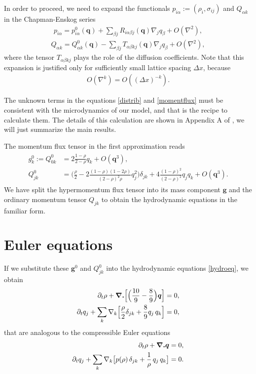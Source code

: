 In order to proceed, we need to expand the functionals $ p_{i\alpha} := (\rho_i,\sigma_{ij})$ and $Q_{\alpha k}$ in the Chapman-Enskog series
\begin{align} \label{distrib}
p_{i \alpha} = p_{i \alpha}^0(\bm{q}) + \sum_{\beta j} R_{i \alpha \beta j}(\bm{q}) \nabla_{j} q_{\beta} + O(\nabla^2),
\end{align}
\begin{align} \label{momentflux}
Q_{\alpha k} = Q_{\alpha k}^0(\bm{q}) - \sum_{\beta j} T_{\alpha \beta k j}(\bm{q}) \nabla_{j} q_{\beta} + O(\nabla^2),
\end{align}
where the tensor $T_{\alpha \beta k j}$ plays the role of the diffusion coefficients.
Note that this expansion is justified only for sufficiently small lattice spacing $\Delta x$, because
\begin{align*}
O(\nabla^k) = O((\Delta x)^{-k}).
\end{align*}

The unknown terms in the equations \ref{distrib} and \ref{momentflux} must be consistent with the microdynamics of our model, and that is the recipe to calculate them.
The details of this calculation are shown in Appendix A of \cite{nasilowski}, we will just summarize the main results.

The momentum flux tensor in the first approximation reads
\begin{align} \label{mft1ap}
\begin{split}
g^0_k := Q^0_{0k} &= 2 \frac{1 - \rho}{2 - \rho} q_k + O(\bm{q}^3), \\
Q^0_{jk} &= \Big( \frac{\rho}{2} - 2 \frac{(1-\rho)(1-2\rho)}{(2-\rho)^2\rho} q_j^2 \Big) \delta_{jk} + 4 \frac{(1-\rho)^2}{(2-\rho)^2} q_j q_k + O(\bm{q}^3).
\end{split}
\end{align}
We have split the hypermomentum flux tensor into its mass component $\bm{g}$ and the ordinary momentum tensor $Q_{jk}$ to obtain the hydrodynamic equations in the familiar form.

\section{Euler equations}
If we substitute these $\bm{g}^0$ and $Q_{jk}^0$ into the hydrodynamic equations \ref{hydroeq}, we obtain
\begin{align}
\begin{split} \label{O2}
\partial_t \rho + \bm{\nabla.} \Big[ \Big( \frac{10}{9} - \frac{8}{9} \Big) \bm{q} \Big] &= 0,\\
\partial_t q_j + \sum_k \nabla_k \Big[\frac{\rho}{2} \delta_{jk} + \frac{8}{9}q_j\,q_k \Big] &= 0,
\end{split}
\end{align}
that are analogous to the compressible Euler equations
\begin{align}
\begin{split}
\partial_t \rho + \bm{\nabla . q} = 0, \\
\partial_t q_j + \sum_k \nabla_k \big[ p(\rho) \, \delta_{jk} + \frac{1}{\rho} \, q_j \, q_k \big]= 0.
\end{split}
\end{align}

